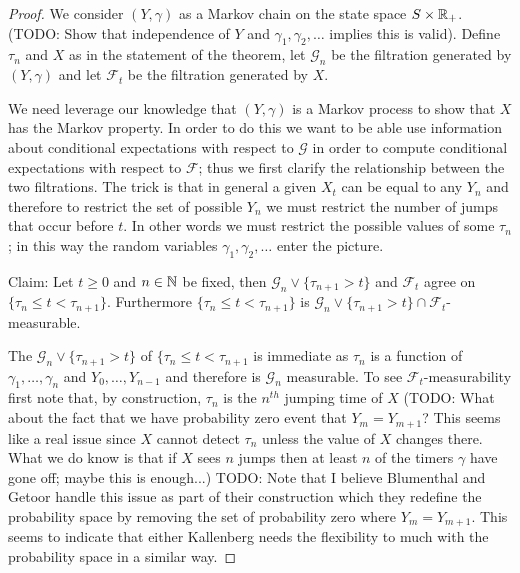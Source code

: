 \begin{proof}
We consider $(Y, \gamma)$ as a Markov chain on the state space $S
\times \mathbb{R}_+$.  (TODO: Show that independence of $Y$ and $\gamma_1,
\gamma_2, \dotsc$ implies this is valid).  Define $\tau_n$ and $X$ as
in the statement of the theorem, let $\mathcal{G}_n$ be the filtration
generated by $(Y, \gamma)$ and let $\mathcal{F}_t$ be the filtration
generated by $X$.

We need leverage our knowledge that $(Y,\gamma)$ is a Markov process
to show that $X$ has the Markov property.  In order to do this we want
to be able use information about conditional expectations with respect
to $\mathcal{G}$ in order to compute conditional expectations with
respect to $\mathcal{F}$; thus we first clarify the relationship
between the two filtrations.  The trick is that in general a given
$X_t$ can be equal to any $Y_n$ and therefore to restrict the set of
possible $Y_n$ we must restrict the number of jumps that occur before
$t$.  In other words we must restrict the possible values of some
$\tau_n$; in this way the random variables $\gamma_1, \gamma_2,
\dotsc$ enter the picture.

Claim: Let $t \geq 0$ and $n \in \mathbb{N}$ be fixed, then
$\mathcal{G}_n \vee \lbrace \tau_{n+1} > t \rbrace$ and
$\mathcal{F}_t$ agree on $\lbrace \tau_n \leq t < \tau_{n+1}\rbrace$.
Furthermore $\lbrace \tau_n \leq t < \tau_{n+1}\rbrace$ is
$\mathcal{G}_n \vee \lbrace \tau_{n+1} > t\rbrace\cap \mathcal{F}_t$-measurable.

The $\mathcal{G}_n \vee \lbrace \tau_{n+1} > t \rbrace$ of $\lbrace
\tau_n \leq t < \tau_{n+1}$ is immediate as $\tau_n$ is a function of
$\gamma_1, \dotsc, \gamma_n$ and $Y_0, \dotsc, Y_{n-1}$ and therefore is
$\mathcal{G}_n$ measurable.  To see $\mathcal{F}_t$-measurability
first note that, by construction, $\tau_n$ is the $n^{th}$ jumping
time of $X$ (TODO: What about the fact that we have probability zero
event that $Y_m = Y_{m+1}$?  This seems like a real issue since $X$
cannot detect $\tau_n$ unless the value of $X$ changes there.  What we
do know is that if $X$ sees $n$ jumps then at least $n$ of the timers
$\gamma$ have gone off; maybe this is enough...)
TODO:  Note that I believe Blumenthal and Getoor handle this issue as part of their construction which they redefine the probability space by 
removing the set of probability zero where $Y_m = Y_{m+1}$.  This seems to indicate that either Kallenberg needs the flexibility to much with the
probability space in a similar way.


\end{proof}
